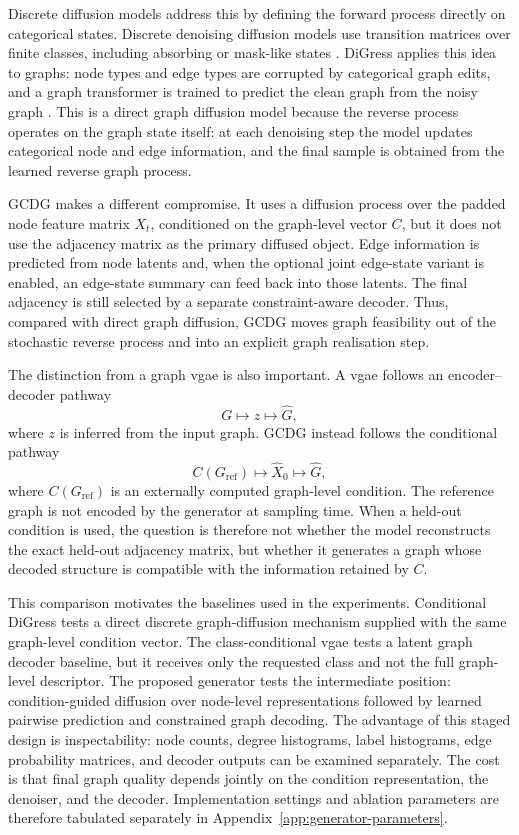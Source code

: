 Discrete diffusion models address this by defining the forward process directly
on categorical states. Discrete denoising diffusion models use transition
matrices over finite classes, including absorbing or mask-like states
\citep{austin2021structured}. DiGress applies this idea to graphs: node types
and edge types are corrupted by categorical graph edits, and a graph transformer
is trained to predict the clean graph from the noisy graph
\citep{vignac2022digress}. This is a direct graph diffusion model because the
reverse process operates on the graph state itself: at each denoising step the
model updates categorical node and edge information, and the final sample is
obtained from the learned reverse graph process.

GCDG makes a different compromise. It uses a diffusion process over the padded
node feature matrix \(X_t\), conditioned on the graph-level vector \(C\), but it
does not use the adjacency matrix as the primary diffused object. Edge
information is predicted from node latents and, when the optional joint
edge-state variant is enabled, an edge-state summary can feed back into those
latents. The final adjacency is still selected by a separate constraint-aware
decoder. Thus, compared with direct graph diffusion, GCDG moves graph
feasibility out of the stochastic reverse process and into an explicit graph
realisation step.

The distinction from a graph \gls{vgae} is also important. A \gls{vgae} follows
an encoder--decoder pathway
\[
    G \mapsto z \mapsto \hat G,
\]
where \(z\) is inferred from the input graph. GCDG instead follows the
conditional pathway
\[
    C(G_{\mathrm{ref}}) \mapsto \hat X_0 \mapsto \hat G,
\]
where \(C(G_{\mathrm{ref}})\) is an externally computed graph-level condition.
The reference graph is not encoded by the generator at sampling time. When a
held-out condition is used, the question is therefore not whether the model
reconstructs the exact held-out adjacency matrix, but whether it generates a
graph whose decoded structure is compatible with the information retained by
\(C\).

This comparison motivates the baselines used in the experiments. Conditional
DiGress tests a direct discrete graph-diffusion mechanism supplied with the
same graph-level condition vector. The class-conditional \gls{vgae} tests a
latent graph decoder baseline, but it receives only the requested class and not
the full graph-level descriptor. The proposed generator tests the intermediate
position: condition-guided diffusion over node-level representations followed
by learned pairwise prediction and constrained graph decoding. The advantage of
this staged design is inspectability: node counts, degree histograms,
label histograms, edge probability matrices, and decoder outputs can be
examined separately. The cost is that final graph quality depends jointly on
the condition representation, the denoiser, and the decoder. Implementation
settings and ablation parameters are therefore tabulated separately in
Appendix~\ref{app:generator-parameters}.

